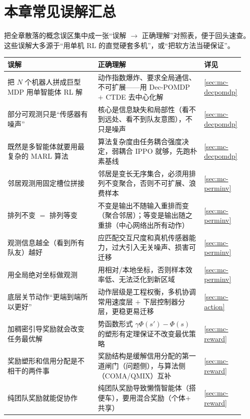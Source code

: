 \section*{本章常见误解汇总}

把全章散落的概念误区集中成一张“误解 $\to$ 正确理解”对照表，便于回头速查。这些误解大多源于“用单机 RL 的直觉硬套多机”，或“把软方法当硬保证”。

\begin{table}[H]\centering\small
\begin{tabular}{p{0.40\linewidth}p{0.46\linewidth}p{0.08\linewidth}}
\toprule
误解 & 正确理解 & 详见 \\
\midrule
把 $N$ 个机器人拼成巨型 MDP 用单智能体 RL 解 & 动作指数爆炸、要求全局通信、不可扩展——用 Dec-POMDP $+$ CTDE 去中心化解 & \cref{sec:mc-decpomdp} \\
部分可观测只是“传感器有噪声” & 核心是信息缺失和局部性（看不到远处、看不到队友意图），不只是噪声 & \cref{sec:mc-decpomdp} \\
既然是多智能体就要用最复杂的 MARL 算法 & 算法复杂度由任务耦合强度决定，弱耦合 IPPO 就够，先跑朴素基线 & \cref{sec:mc-decpomdp} \\
邻居观测用固定槽位拼接 & 邻居是变长无序集合，必须用排列不变聚合，否则不可扩展、浪费样本 & \cref{sec:mc-perminv} \\
排列不变 $=$ 排列等变 & 不变是输出不随输入重排而变（聚合邻居）；等变是输出随之重排（中心网络出所有动作） & \cref{sec:mc-perminv} \\
观测信息越全（看到所有队友）越好 & 应匹配交互尺度和真机传感器能力，过大引入无关噪声、损害可迁移 & \cref{sec:mc-perminv} \\
用全局绝对坐标做观测 & 用相对/本地坐标，否则样本效率低、无法泛化到新区域 & \cref{sec:mc-perminv} \\
底层关节动作“更端到端所以更好” & 动作层级是工程权衡，多机协调常用速度层 $+$ 下层控制器分层，更稳更易迁移 & \cref{sec:mc-action} \\
加稠密引导奖励就会改变任务最优解 & 势函数形式 $\gamma\Phi(s')-\Phi(s)$ 的塑形有定理保证不改变最优策略 & \cref{sec:mc-reward} \\
奖励塑形和信用分配是不相干的两件事 & 奖励结构是缓解信用分配的第一道闸门（问题侧），与算法侧（COMA/QMIX）互补 & \cref{sec:mc-reward} \\
纯团队奖励就能促协作 & 纯团队奖励导致懒惰智能体（搭便车），要用混合奖励（个体$+$共享） & \cref{sec:mc-reward} \\

\end{tabular}
\end{table}

